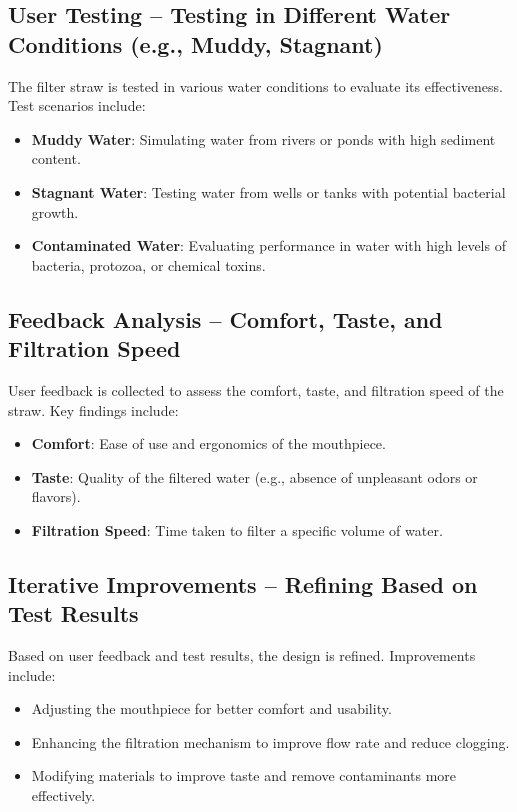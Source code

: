 \documentclass{article}
\begin{document}
\vspace{0.5cm}

\subsection{User Testing – Testing in Different Water Conditions (e.g., Muddy, Stagnant)}
The filter straw is tested in various water conditions to evaluate its effectiveness. Test scenarios include:
\begin{itemize}
    \item \textbf{Muddy Water}: Simulating water from rivers or ponds with high sediment content.
    \item \textbf{Stagnant Water}: Testing water from wells or tanks with potential bacterial growth.
    \item \textbf{Contaminated Water}: Evaluating performance in water with high levels of bacteria, protozoa, or chemical toxins.
\end{itemize}

\vspace{0.5cm}

\subsection{Feedback Analysis – Comfort, Taste, and Filtration Speed}
User feedback is collected to assess the comfort, taste, and filtration speed of the straw. Key findings include:
\begin{itemize}
    \item \textbf{Comfort}: Ease of use and ergonomics of the mouthpiece.
    \item \textbf{Taste}: Quality of the filtered water (e.g., absence of unpleasant odors or flavors).
    \item \textbf{Filtration Speed}: Time taken to filter a specific volume of water.
\end{itemize}

\vspace{0.5cm}

\subsection{Iterative Improvements – Refining Based on Test Results}
Based on user feedback and test results, the design is refined. Improvements include:
\begin{itemize}
    \item Adjusting the mouthpiece for better comfort and usability.
    \item Enhancing the filtration mechanism to improve flow rate and reduce clogging.
    \item Modifying materials to improve taste and remove contaminants more effectively.
\end{itemize}
\end{document}
